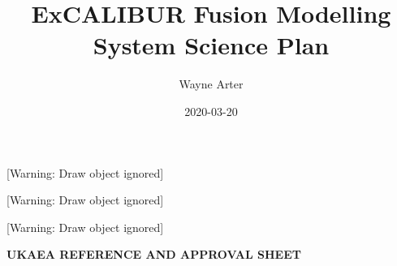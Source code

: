 \documentclass[a4paper]{article}
\title{ExCALIBUR Fusion Modelling System Science Plan}
\author{Wayne Arter}
\date{2020-03-20}
\newcommand\textstyleGuidanceTextChar[1]{\foreignlanguage{english}{\textrm{\textcolor[rgb]{0.0,0.1882353,0.33333334}{#1}}}}
\begin{document}
\clearpage\setcounter{page}{1}\pagestyle{Standard}
\thispagestyle{FirstPage}
[Warning: Draw object ignored]%



\bigskip


\bigskip


\bigskip


\bigskip

[Warning: Draw object ignored]

[Warning: Draw object ignored]\ 

\clearpage
\bigskip


\bigskip

{\centering
\textstyleGuidanceTextChar{\textbf{UKAEA REFERENCE AND APPROVAL SHEET}}
\par}
\end{document}
